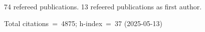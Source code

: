 74 refereed publications. 13 refeered publications as first author.

Total citations~=~4875; h-index~=~37 (2025-05-13)